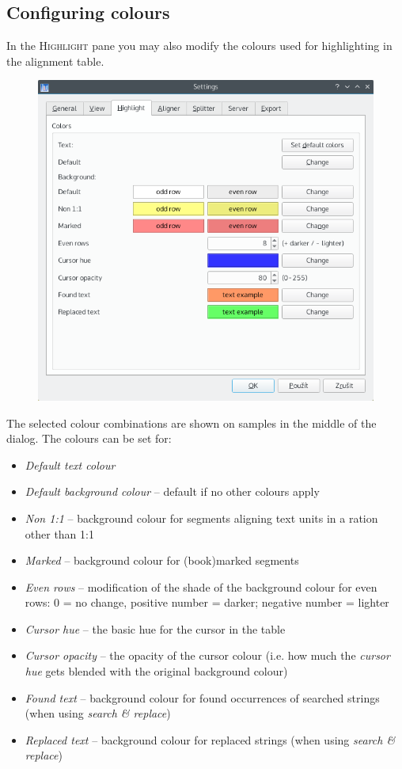 \documentclass[a4paper,10pt,oneside]{book}
\newcommand{\menu}[1]{\textsc{#1}}
\begin{document}
\subsection{Configuring colours}

In the \menu{Highlight} pane you may also modify the colours used for highlighting in the alignment table.

\begin{figure}[htbf]
 \includegraphics[width=\textwidth]{screenshots/settings_highlight.png}
\end{figure}

The selected colour combinations are shown on samples in the middle of the dialog. The colours can be set for:

\begin{itemize}
 \item \emph{Default text colour}
 \item \emph{Default background colour} -- default if no other colours apply
 \item \emph{Non 1:1} -- background colour for segments aligning text units in a ration other than 1:1
 \item \emph{Marked} -- background colour for (book)marked segments
 \item \emph{Even rows} -- modification of the shade of the background colour for even rows: 0 = no change, positive number = darker; negative number = lighter
 \item \emph{Cursor hue} -- the basic hue for the cursor in the table
 \item \emph{Cursor opacity} -- the opacity of the cursor colour (i.e. how much the \emph{cursor hue} gets blended with the original background colour)
 \item \emph{Found text} -- background colour for found occurrences of searched strings (when using \emph{search \& replace})
 \item \emph{Replaced text} -- background colour for replaced strings (when using \emph{search \& replace})
\end{itemize}
\end{document}
